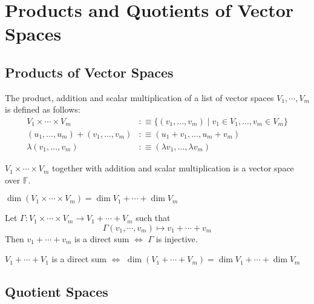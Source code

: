\section{Products and Quotients of Vector Spaces}
\subsection{Products of Vector Spaces}

\begin{mydef}
  The product, addition and scalar multiplication of a list of vector spaces $V_1, \cdots, V_m$ is defined as follows: 
  \begin{equation}
    \begin{aligned}
      V_1 \times \cdots \times V_m &:\equiv \{ (v_1, \dots, v_m) \mid v_1 \in V_1, \dots, v_m \in V_m\} \\
      (u_1, \dots, u_m) + (v_1, \dots, v_m) &:\equiv (u_1+v_1, \dots, u_m+v_m) \\
      \lambda (v_1, \dots, v_m) &:\equiv (\lambda v_1, \dots, \lambda v_m)
    \end{aligned}
  \end{equation}
\end{mydef}

\setcounter{thm}{88}
\begin{thm}
  $V_1 \times \cdots \times V_m$ together with addition and scalar multiplication is a vector space over $\mathbb{F}$.
\end{thm}

\setcounter{thm}{91}
\begin{thm}
  $\dim (V_1 \times \cdots \times V_m) = \dim V_1 + \cdots + \dim V_m$
\end{thm}

\begin{thm}
  Let $\Gamma: V_1 \times \cdots \times V_m \to V_1 + \cdots + V_m$ such that
  \begin{equation}
    \Gamma(v_1, \cdots, v_m) \mapsto v_1 + \cdots + v_m
  \end{equation}
  Then $v_1 + \cdots + v_m$ is a direct sum $\iff$ $\Gamma$ is injective.
\end{thm}

\begin{thm}$V_1 + \cdots + V_1$ is a direct sum $\iff$
  $\dim (V_1+\cdots+V_m) = \dim V_1 + \cdots + \dim V_m$
\end{thm}

\subsection{Quotient Spaces}

